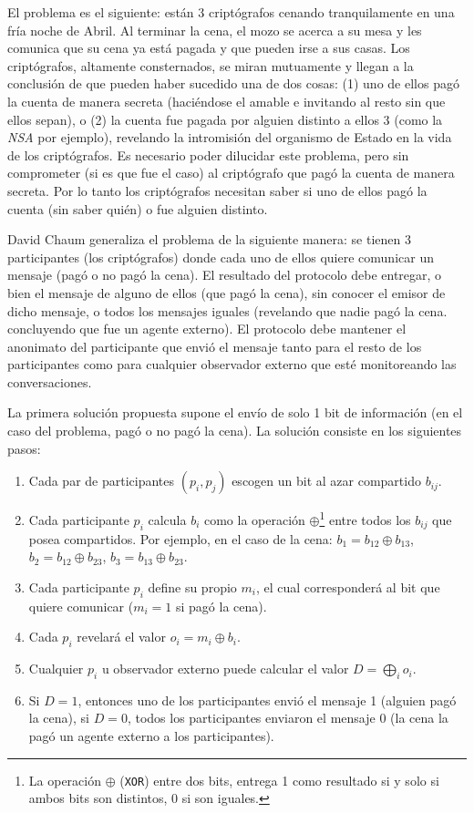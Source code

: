 El problema es el siguiente: están 3 criptógrafos cenando tranquilamente en una fría noche de Abril. Al terminar la cena, el mozo se acerca a su mesa y les comunica que su cena ya está pagada y que pueden irse a sus casas. Los criptógrafos, altamente consternados, se miran mutuamente y llegan a la conclusión de que pueden haber sucedido una de dos cosas: (1) uno de ellos pagó la cuenta de manera secreta (haciéndose el amable e invitando al resto sin que ellos sepan), o (2) la cuenta fue pagada por alguien distinto a ellos 3 (como la \emph{NSA} por ejemplo), revelando la intromisión del organismo de Estado en la vida de los criptógrafos. Es necesario poder dilucidar este problema, pero sin comprometer (si es que fue el caso) al criptógrafo que pagó la cuenta de manera secreta. Por lo tanto los criptógrafos necesitan saber si uno de ellos pagó la cuenta (sin saber quién) o fue alguien distinto.

David Chaum generaliza el problema de la siguiente manera: se tienen 3 participantes (los criptógrafos) donde cada uno de ellos quiere comunicar un mensaje (pagó o no pagó la cena). El resultado del protocolo debe entregar, o bien el mensaje de alguno de ellos (que pagó la cena),  sin conocer el emisor de dicho mensaje, o todos los mensajes iguales (revelando que nadie pagó la cena. concluyendo que fue un agente externo). El protocolo debe mantener el anonimato del participante que envió el mensaje tanto para el resto de los participantes como para cualquier observador externo que esté monitoreando las conversaciones.

La primera solución propuesta supone el envío de solo 1 bit de información (en el caso del problema, pagó o no pagó la cena). La solución consiste en los siguientes pasos:
\begin{enumerate}
    \item Cada par de participantes $(p_i, p_j)$ escogen un bit al azar compartido $b_{ij}$.
    \item Cada participante $p_i$ calcula $b_i$ como la operación $\oplus$\footnote{La operación $\oplus$ (\texttt{XOR}) entre dos bits, entrega 1 como resultado si y solo si ambos bits son distintos, 0 si son iguales.} entre todos los $b_{ij}$ que posea compartidos. Por ejemplo, en el caso de la cena: $b_1 = b_{12} \oplus b_{13}$, $b_2 = b_{12} \oplus b_{23}$, $b_3 = b_{13} \oplus b_{23}$.
    \item Cada participante $p_i$ define su propio $m_i$, el cual corresponderá al bit que quiere comunicar ($m_i = 1$ si pagó la cena).
    \item Cada $p_i$ revelará el valor $o_i = m_i \oplus b_i$.
    \item Cualquier $p_i$ u observador externo puede calcular el valor $D = \displaystyle\bigoplus_i o_i$.
    \item Si $D = 1$, entonces uno de los participantes envió el mensaje 1 (alguien pagó la cena), si $D = 0$, todos los participantes enviaron el mensaje 0 (la cena la pagó un agente externo a los participantes).
\end{enumerate}

